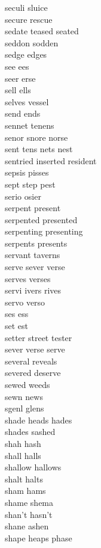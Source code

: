 seculi sluice\\
secure rescue\\
sedate teased seated\\
seddon sodden\\
sedge edges\\
see ees\\
seer erse\\
sell ells\\
selves vessel\\
send ends\\
sennet tenens\\
senor snore norse\\
sent tens nets nest\\
sentried inserted resident\\
sepsis pisses\\
sept step pest\\
serio osier\\
serpent present\\
serpented presented\\
serpenting presenting\\
serpents presents\\
servant taverns\\
serve sever verse\\
serves verses\\
servi ivers rives\\
servo verso\\
ses ess\\
set est\\
setter street tester\\
sever verse serve\\
several reveals\\
severed deserve\\
sewed weeds\\
sewn news\\
sgenl glens\\
shade heads hades\\
shades sashed\\
shah hash\\
shall halls\\
shallow hallows\\
shalt halts\\
sham hams\\
shame shema\\
shan't hasn't\\
shane ashen\\
shape heaps phase\\
